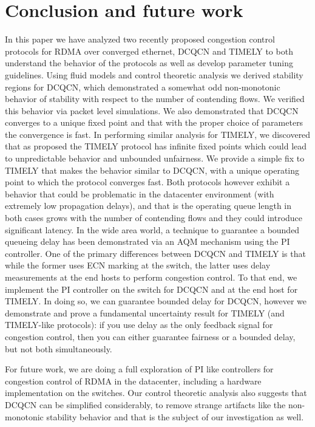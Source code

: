 \section{Conclusion and future work}
In this paper we have analyzed two recently proposed congestion control
protocols for RDMA over converged ethernet, DCQCN and TIMELY to both
understand the behavior of the protocols as well as develop parameter
tuning guidelines. Using
fluid models and control theoretic analysis we derived stability regions
for DCQCN, which demonstrated a somewhat odd non-monotonic behavior of
stability with respect to the number of contending flows. We verified
this behavior via packet level simulations. We also demonstrated that DCQCN
converges to a unique fixed point and that with the proper choice of
parameters the convergence is fast. In performing similar analysis
for TIMELY, we discovered that as proposed the TIMELY protocol has
infinite fixed points which could lead to unpredictable behavior and
unbounded unfairness. We provide a simple fix to TIMELY that makes the
behavior similar to DCQCN, with a unique operating point to which the
protocol converges fast. Both protocols however exhibit a behavior that
could be problematic in the datacenter environment (with extremely low
propagation delays), and that is the
operating queue length in both cases grows with the number of
contending flows and they could introduce significant latency. In the
wide area world, a technique to guarantee a bounded queueing delay has
been demonstrated via an AQM mechanism using the PI controller. One of
the primary differences between DCQCN and TIMELY is that while the
former uses ECN marking at the switch, the latter uses delay
measurements at the end hosts to perform congestion control. To that
end, we implement the PI controller on the switch for DCQCN and at the
end host for TIMELY. In doing so, we can guarantee bounded delay for
DCQCN, however we demonstrate and prove a fundamental uncertainty
result for TIMELY (and TIMELY-like protocols): if you use delay as the only
feedback signal for congestion control, then you can either guarantee
fairness or a bounded delay, but not both simultaneously.

For future work, we are doing a full exploration of PI like
controllers for congestion control of RDMA in the datacenter,
including a hardware implementation on the switches. Our control
theoretic analysis also suggests that DCQCN can be simplified
considerably, to remove strange artifacts like the non-monotonic
stability behavior and that is the subject of our investigation as well.

